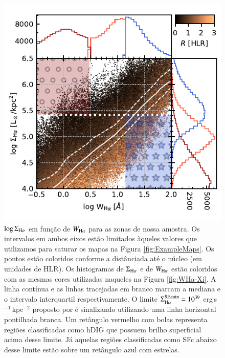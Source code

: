 \begin{figure}
 \includegraphics[scale=1.5]{figuras/fig_logSBHa_logWHa_histograms.pdf}
 \caption[$\log \Sigma_{{\rm H}\alpha} \times \log W_{{\rm H}\alpha}$]
 {$\log \Sigma_{\Ha}$ em função de $W_{\Ha}$ para as zonas de nossa amostra. Os intervalos em ambos eixos estão limitados àqueles valores que utilizamos para saturar os mapas na Figura \ref{fig:ExampleMaps}. Os pontos estão coloridos conforme a distânciada até o núcleo (em unidades de HLR). Os histogramas de $\Sigma_{\Ha}$ e de $W_{\Ha}$ estão coloridos com as mesmas cores utilizadas naqueles na Figura \ref{fig:WHa-Xi}. A linha contínua e as linhas tracejadas em branco marcam a mediana e o intervalo interquartil respectivamente. O limite $\Sigma^{\rm SF,min}_{\Ha} = 10^{39}$ erg$\,$s$^{-1}\,$kpc$^{-2}$ proposto por \citet{Zhang.etal.2017a} é sinalizando utilizando uma linha horizontal pontilhada branca. Um retângulo vermelho com bolas representa regiões classificadas como hDIG que possuem brilho superficial acima desse limite. Já aquelas regiões classificadas como SFc abaixo desse limite estão sobre um retângulo azul com estrelas.}
 \label{fig:logWHa_logSBHa_histo}
\end{figure}

